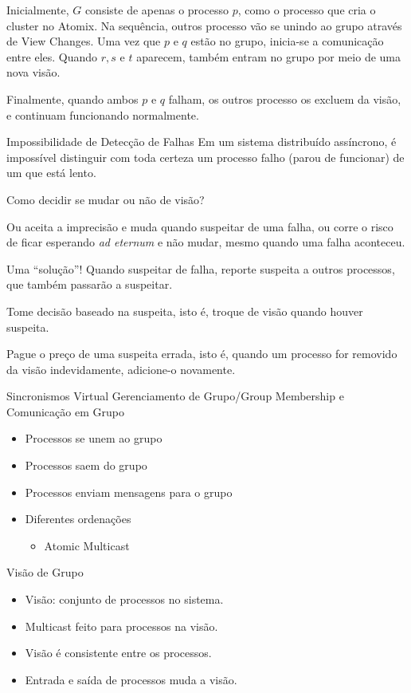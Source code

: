 Inicialmente, $G$ consiste de apenas o processo $p$, como o processo que cria o cluster no Atomix. Na sequência, outros processo vão se unindo ao grupo através de View Changes. Uma vez que $p$ e $q$ estão no grupo, inicia-se a comunicação entre eles. Quando $r, s$ e $t$ aparecem, também entram no grupo por meio de uma nova visão.

Finalmente, quando ambos $p$ e $q$ falham, os outros processo os excluem da visão, e continuam funcionando normalmente.


\begin{frame}{Impossibilidade de Detecção de Falhas}
Em um sistema distribuído assíncrono, é impossível distinguir com toda certeza um processo falho (parou de funcionar) de um que está lento.

\pause Como decidir se mudar ou não de visão?
\end{frame}

Ou aceita a imprecisão e muda quando suspeitar de uma falha, ou corre o risco de ficar esperando \emph{ad eternum} e não mudar, mesmo quando uma falha aconteceu.

\begin{frame}{Uma ``solução''!}
Quando suspeitar de falha, reporte suspeita a outros processos, que também passarão a suspeitar.

Tome decisão baseado na suspeita, isto é, troque de visão quando houver suspeita.

Pague o preço de uma suspeita errada, isto é, quando um processo for removido da visão indevidamente, adicione-o novamente.
\end{frame}


\begin{frame}{Sincronismos Virtual}
Gerenciamento de Grupo/Group Membership e Comunicação em Grupo
\begin{itemize}
	\item Processos se unem ao grupo
	\item Processos saem do grupo
	\item Processos enviam mensagens para o grupo
	\item Diferentes ordenações
		\begin{itemize}
			\item Atomic Multicast
		\end{itemize}
\end{itemize}
\end{frame}

\begin{frame}{Visão de Grupo}
\begin{itemize}
	\item Visão: conjunto de processos no sistema.
	\item Multicast feito para processos na visão.
	\item Visão é consistente entre os processos.
	\item Entrada e saída de processos muda a visão.
\end{itemize}
\end{frame}

